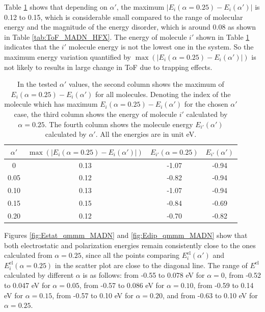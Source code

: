 \documentclass[%
 reprint,
 amsmath,amssymb,
 aps,
]{revtex4-2}
\begin{document}
Table \ref{tab:maxEi} shows that depending on $\alpha'$, the maximum $|E_i(\alpha=0.25) - E_i(\alpha')|$ is 0.12 to 0.15, which is considerable small compared to the range of molecular energy and the magnitude of the energy disorder, which is around 0.08 as shown in Table \ref{tab:ToF_MADN_HFX}. 
The energy of molecule $i'$ shown in Table \ref{tab:maxEi} indicates that the $i'$ molecule energy is not the lowest one in the system. So the maximum energy variation quantified by $\max(|E_i(\alpha=0.25) - E_i(\alpha')|)$ is not likely to results in large change in ToF due to trapping effects. 
%
\begin{table}[tbp]%
\caption{\label{tab:maxEi}%
In the tested $\alpha'$ values, the second column shows the maximum of $E_i(\alpha=0.25) - E_i(\alpha')$ for all molecules. Denoting the index of the molecule which has maximum $E_i(\alpha=0.25) - E_i(\alpha')$ for the chosen $\alpha'$ case, the third column shows the energy of molecule $i'$ calculated by $\alpha=0.25$. The fourth column shows the molecule energy $E_{i'}(\alpha')$ calculated by $\alpha'$. All the energies are in unit \unit[]{eV}.
}
\begin{ruledtabular}
  \begin{tabular}{c c c c}
  $\alpha'$ & $\max(|E_i(\alpha=0.25) - E_i(\alpha')|)$  & $E_{i'}(\alpha=0.25)$ & $E_{i'}(\alpha')$ \\
    \hline
  0 & 0.13 &  -1.07 & -0.94 \\
  0.05 & 0.12 & -0.82 & -0.94 \\
  0.10 & 0.13 & -1.07 & -0.94 \\
  0.15 & 0.15 & -0.84 & -0.69 \\
  0.20 & 0.12 & -0.70 & -0.82 \\
    \end{tabular}
\end{ruledtabular}
\end{table}

Figures \ref{fig:Estat_qmmm_MADN} and \ref{fig:Edip_qmmm_MADN} show that both electrostatic and polarization energies remain consistently close to the ones calculated from $\alpha=0.25$, since all the points comparing $E^\text{el}_i(\alpha')$ and $E^\text{el}_i(\alpha=0.25)$ in the scatter plot are close to the diagonal line.
The range of $E^\text{el}$ calculated by different $\alpha$ is as follows:
from  -0.55 to 0.078 eV for $\alpha=0$, 
from  -0.52 to 0.047 eV for $\alpha=0.05$, 
from  -0.57 to 0.086 eV for $\alpha=0.10$, 
from  -0.59 to 0.14 eV for $\alpha=0.15$, 
from  -0.57 to 0.10 eV for $\alpha=0.20$, 
and from -0.63 to 0.10 eV for $\alpha=0.25$.
\end{document}
